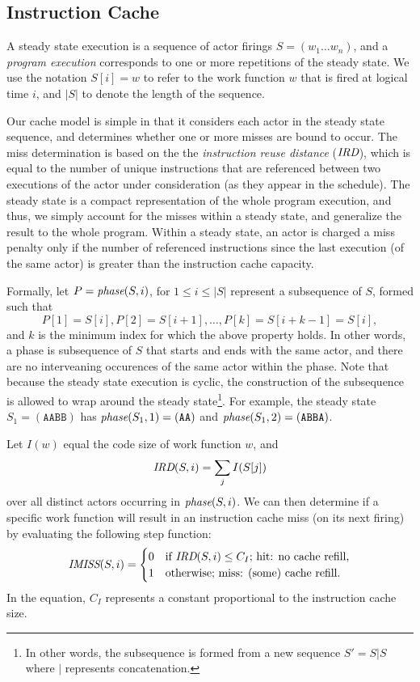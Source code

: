 \subsection{Instruction Cache}

A steady state execution is a sequence of actor firings
$S=(w_1\ldots w_n)$, and a
{\it program execution} corresponds to one or more repetitions of the
steady state. We use the notation $S[i]=w$ to refer to the
work function $w$ that is fired at logical time $i$, and $|S|$ to
denote the length of the sequence. 

Our cache model is simple in that it considers each actor in the
steady state sequence, and determines whether one or more misses are
bound to occur. The miss determination is based on the 
the {\it instruction reuse distance} ($\mbox{\it IRD}$), which is equal to
the number of unique instructions that are referenced between two
executions of the actor under consideration (as they appear in the
schedule). The steady state is a 
compact representation of the whole program execution, and thus, we
simply account for the misses within a steady state, and generalize
the result to the whole program. Within a steady state, an actor is
charged a miss penalty only if the number of referenced instructions
since the last execution (of the same actor)
is greater than the instruction cache capacity.

Formally, let $P=\mbox{\it phase}(S,i)$, for $1\le i\le|S|$ represent a
subsequence of $S$,  
formed such that 
\[ 
P[1]=S[i], P[2]=S[i+1], \ldots, P[k]=S[i+k-1]=S[i],
\]
and $k$ is the minimum index for which the above property holds. 
In other words, a phase is subsequence of $S$ that starts and ends
with the same actor, and there are no interveaning occurences of the
same actor within the phase. Note that because the steady state
execution is cyclic, the 
construction of the subsequence is allowed to wrap around the steady
state\footnote{In other words, the subsequence is formed from a new
sequence $S'=S|S$ where $|$ represents concatenation.}. For example,
the steady state $S_1=(\texttt{AABB})$ has
$\mbox{\it phase}(S_1,1)=(\texttt{AA})$ and
$\mbox{\it phase}(S_1,2)=(\texttt{ABBA})$.

Let $I(w)$ equal the code size of work function $w$, and
\[
\mbox{\it IRD}(S,i)=\sum_j I(S[j])
\]
over all distinct actors occurring in
$\mbox{\it phase}(S,i)$. We can then determine if a specific work function will
result in an instruction cache miss (on its next firing) by evaluating
the following step function:
\begin{equation}
\label{eq:imiss}
  \mbox{\it IMISS}(S,i) =
    \begin{cases}
      0& \text{if $\mbox{\it IRD}(S,i) \leq C_I$; hit: no cache refill,}\\
      1& \text{otherwise; miss: (some) cache refill.}
    \end{cases}
\end{equation}
In the equation, $C_I$ represents a constant proportional to the
instruction cache size. 

